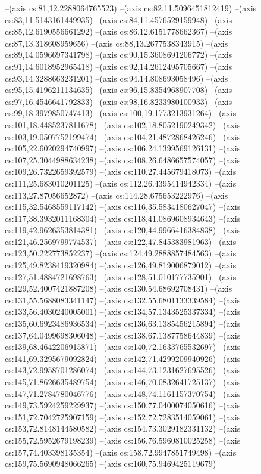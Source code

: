 --(axis cs:81,12.2288064765523)
--(axis cs:82,11.5096451812419)
--(axis cs:83,11.5143161449935)
--(axis cs:84,11.4576529159948)
--(axis cs:85,12.6190556661292)
--(axis cs:86,12.6151778662367)
--(axis cs:87,13.318608959656)
--(axis cs:88,13.2677538343915)
--(axis cs:89,14.0596697341798)
--(axis cs:90,15.3608691206772)
--(axis cs:91,14.6018952965418)
--(axis cs:92,14.2612495705667)
--(axis cs:93,14.3288663231201)
--(axis cs:94,14.808693058496)
--(axis cs:95,15.4196211134635)
--(axis cs:96,15.8354968907708)
--(axis cs:97,16.4546641792833)
--(axis cs:98,16.8233980100933)
--(axis cs:99,18.3979850747413)
--(axis cs:100,19.1773213931264)
--(axis cs:101,18.4485237811678)
--(axis cs:102,18.8052190249342)
--(axis cs:103,19.0507752199474)
--(axis cs:104,21.4872868426246)
--(axis cs:105,22.6020294740997)
--(axis cs:106,24.1399569126131)
--(axis cs:107,25.3044988634238)
--(axis cs:108,26.6486657574057)
--(axis cs:109,26.7322659392579)
--(axis cs:110,27.445679418073)
--(axis cs:111,25.683010201125)
--(axis cs:112,26.4395414942334)
--(axis cs:113,27.87056652872)
--(axis cs:114,28.675653222976)
--(axis cs:115,32.5468559117142)
--(axis cs:116,35.5834180627047)
--(axis cs:117,38.3932011168304)
--(axis cs:118,41.0869608934643)
--(axis cs:119,42.9626353814381)
--(axis cs:120,44.9966416384838)
--(axis cs:121,46.2569799774537)
--(axis cs:122,47.845383981963)
--(axis cs:123,50.222773852237)
--(axis cs:124,49.2888857484563)
--(axis cs:125,49.8238419320984)
--(axis cs:126,49.819006879012)
--(axis cs:127,51.4884721698763)
--(axis cs:128,51.010177735901)
--(axis cs:129,52.4007421887208)
--(axis cs:130,54.68692708431)
--(axis cs:131,55.5688083341147)
--(axis cs:132,55.6801133339584)
--(axis cs:133,56.4030240005001)
--(axis cs:134,57.1343525337334)
--(axis cs:135,60.6923486936534)
--(axis cs:136,63.1385456215894)
--(axis cs:137,64.0499698306048)
--(axis cs:138,67.1387758644839)
--(axis cs:139,68.4642206915871)
--(axis cs:140,72.1633765532697)
--(axis cs:141,69.3295679092824)
--(axis cs:142,71.4299209940926)
--(axis cs:143,72.9958701286074)
--(axis cs:144,73.1231627695526)
--(axis cs:145,71.8626635489754)
--(axis cs:146,70.0832641725137)
--(axis cs:147,71.2784780046776)
--(axis cs:148,74.1161157370754)
--(axis cs:149,73.5924259229937)
--(axis cs:150,77.0400074050616)
--(axis cs:151,72.7042725907159)
--(axis cs:152,72.7283514059061)
--(axis cs:153,72.8148144580582)
--(axis cs:154,73.3029182331132)
--(axis cs:155,72.5952679198239)
--(axis cs:156,76.5960810025258)
--(axis cs:157,74.403398135354)
--(axis cs:158,72.9947851749498)
--(axis cs:159,75.5690948066265)
--(axis cs:160,75.9469425119679)
